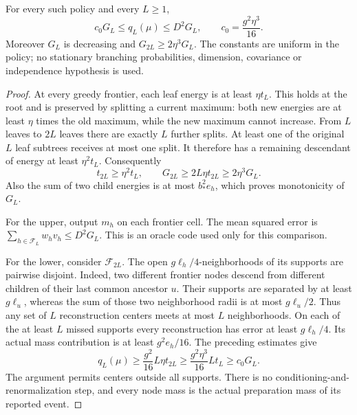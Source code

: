 \begin{lemma}\label{lem:frontiercomparison}
For every such policy and every $L\ge1$,
\begin{equation}\label{eq:frontierquantization}
 c_0G_L\le q_L(\mu)\le D^2G_L,
 \qquad c_0=\frac{g^2\eta^3}{16}.
\end{equation}
Moreover $G_L$ is decreasing and $G_{2L}\ge2\eta^3G_L$. The constants are uniform in the policy; no stationary branching probabilities, dimension, covariance or independence hypothesis is used.
\end{lemma}
\begin{proof}
At every greedy frontier, each leaf energy is at least $\eta t_L$. This holds at the root and is preserved by splitting a current maximum: both new energies are at least $\eta$ times the old maximum, while the new maximum cannot increase. From $L$ leaves to $2L$ leaves there are exactly $L$ further splits. At least one of the original $L$ leaf subtrees receives at most one split. It therefore has a remaining descendant of energy at least $\eta^2t_L$. Consequently
\begin{equation}\label{eq:frontierdoubling}
 t_{2L}\ge\eta^2t_L,\qquad
 G_{2L}\ge2L\eta t_{2L}\ge2\eta^3G_L.
\end{equation}
Also the sum of two child energies is at most $b_*^2e_h$, which proves monotonicity of $G_L$.

For the upper, output $m_h$ on each frontier cell. The mean squared error is $\sum_{h\in\mathcal F_L}w_hv_h\le D^2G_L$. This is an oracle code used only for this comparison.

For the lower, consider $\mathcal F_{2L}$. The open $g\ell_h/4$-neighborhoods of its supports are pairwise disjoint. Indeed, two different frontier nodes descend from different children of their last common ancestor $u$. Their supports are separated by at least $g\ell_u$, whereas the sum of those two neighborhood radii is at most $g\ell_u/2$. Thus any set of $L$ reconstruction centers meets at most $L$ neighborhoods. On each of the at least $L$ missed supports every reconstruction has error at least $g\ell_h/4$. Its actual mass contribution is at least $g^2e_h/16$. The preceding estimates give
\[
 q_L(\mu)\ge\frac{g^2}{16}L\eta t_{2L}
 \ge\frac{g^2\eta^3}{16}Lt_L\ge c_0G_L.
\]
The argument permits centers outside all supports. There is no conditioning-and-renormalization step, and every node mass is the actual preparation mass of its reported event.
\end{proof}

